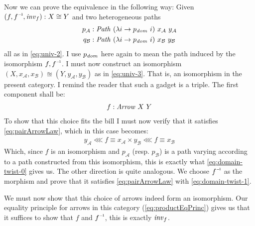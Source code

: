 Now we can prove the equivalence in the following way: Given $(f, \inv{f},
\var{inv}_f) \tp X \cong Y$ and two heterogeneous paths
%
\begin{align*}
p_{\mathcal{A}} & \tp \Path\ (\lambda i \to p_{\var{dom}}\ i)\ x_{\mathcal{A}}\ y_{\mathcal{A}}\\
%
q_{\mathcal{B}} & \tp \Path\ (\lambda i \to p_{\var{dom}}\ i)\ x_{\mathcal{B}}\ y_{\mathcal{B}}
\end{align*}
%
all as in \ref{eq:univ-2}. I use $p_{\mathit{dom}}$ here again to mean the path
induced by the isomorphism $f, \inv{f}$. I must now construct an isomorphism
$(X, x_{\mathcal{A}}, x_{\mathcal{B}}) \approxeq (Y, y_{\mathcal{A}}, y_{\mathcal{B}})$
as in \ref{eq:univ-3}. That is, an isomorphism in the present category. I remind
the reader that such a gadget is a triple. The first component shall be:
%
\begin{align}
f \tp \Arrow\ X\ Y
\end{align}
%
To show that this choice fits the bill I must now verify that it satisfies
\ref{eq:pairArrowLaw}, which in this case becomes:
%
\begin{align}
y_{\mathcal{A}} \lll f ≡ x_{\mathcal{A}} × y_{\mathcal{B}} \lll f ≡ x_{\mathcal{B}}
\end{align}
%
Which, since $f$ is an isomorphism and $p_{\mathcal{A}}$ (resp. $p_{\mathcal{B}}$)
is a path varying according to a path constructed from this isomorphism, this is
exactly what \ref{eq:domain-twist-0} gives us.
%
The other direction is quite analogous. We choose $\inv{f}$ as the morphism and
prove that it satisfies \ref{eq:pairArrowLaw} with \ref{eq:domain-twist-1}.

We must now show that this choice of arrows indeed form an isomorphism. Our
equality principle for arrows in this category (\ref{eq:productEqPrinc}) gives
us that it suffices to show that $f$ and $\inv{f}$, this is exactly
$\mathit{inv}_f$.

